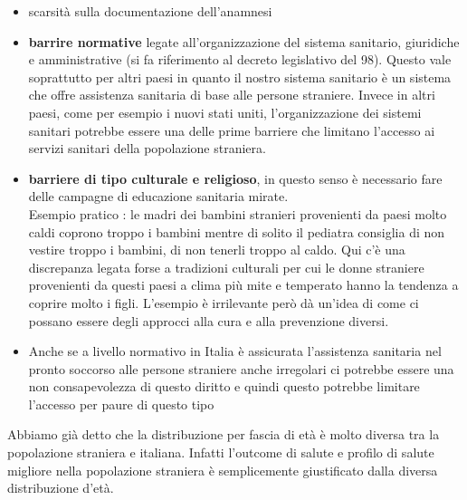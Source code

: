 \begin{itemize}
\item scarsità sulla documentazione dell'anamnesi
\item \textbf{barrire normative} legate all'organizzazione del sistema
sanitario, giuridiche e amministrative (si fa riferimento al decreto
legislativo del 98). Questo vale soprattutto per altri paesi in quanto
il nostro sistema sanitario è un sistema che offre assistenza sanitaria
di base alle persone straniere. Invece in altri paesi, come per esempio
i nuovi stati uniti, l'organizzazione dei sistemi sanitari potrebbe
essere una delle prime barriere che limitano l'accesso ai servizi
sanitari della popolazione straniera.
\item \textbf{barriere di tipo culturale e religioso}, in questo senso è
necessario fare delle campagne di educazione sanitaria mirate.\\
Esempio pratico : le madri dei bambini stranieri provenienti da paesi
molto caldi coprono troppo i bambini mentre di solito il pediatra
consiglia di non vestire troppo i bambini, di non tenerli troppo al
caldo. Qui c'è una discrepanza legata forse a tradizioni culturali per
cui le donne straniere provenienti da questi paesi a clima più mite e
temperato hanno la tendenza a coprire molto i figli. L'esempio è
irrilevante però dà un'idea di come ci possano essere degli approcci
alla cura e alla prevenzione diversi.
\item Anche se a livello normativo in Italia è assicurata l'assistenza
sanitaria nel pronto soccorso alle persone straniere anche irregolari ci
potrebbe essere una non consapevolezza di questo diritto e quindi questo
potrebbe limitare l'accesso per paure di questo tipo
\end{itemize}

Abbiamo già detto che la distribuzione per fascia di età è molto diversa
tra la popolazione straniera e italiana. Infatti l'outcome di salute e
profilo di salute migliore nella popolazione straniera è semplicemente
giustificato dalla diversa distribuzione d'età.

